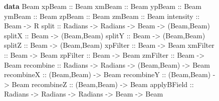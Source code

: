 \documentclass[12pt]{article}
\newcommand{\KeywordTok}[1]{\textcolor[rgb]{0.00,0.44,0.13}{\textbf{{#1}}}}
\newcommand{\DataTypeTok}[1]{\textcolor[rgb]{0.56,0.13,0.00}{{#1}}}
\newcommand{\SpecialCharTok}[1]{\textcolor[rgb]{0.25,0.44,0.63}{{#1}}}
\newcommand{\FunctionTok}[1]{\textcolor[rgb]{0.02,0.16,0.49}{{#1}}}
\newcommand{\NormalTok}[1]{{#1}}
\begin{document}
\begin{figure}
\begin{Highlighting}[]
\KeywordTok{data} \DataTypeTok{Beam}
\FunctionTok{xpBeam} \SpecialCharTok{::} \DataTypeTok{Beam}
\FunctionTok{xmBeam} \SpecialCharTok{::} \DataTypeTok{Beam}
\FunctionTok{ypBeam} \SpecialCharTok{::} \DataTypeTok{Beam}
\FunctionTok{ymBeam} \SpecialCharTok{::} \DataTypeTok{Beam}
\FunctionTok{zpBeam} \SpecialCharTok{::} \DataTypeTok{Beam}
\FunctionTok{zmBeam} \SpecialCharTok{::} \DataTypeTok{Beam}
\FunctionTok{intensity} \SpecialCharTok{::} \DataTypeTok{Beam} \SpecialCharTok{->} \DataTypeTok{R}
\FunctionTok{split} \SpecialCharTok{::} \DataTypeTok{Radians} \SpecialCharTok{->} \DataTypeTok{Radians} \SpecialCharTok{->} \DataTypeTok{Beam} \SpecialCharTok{->} \NormalTok{(}\DataTypeTok{Beam}\NormalTok{,}\DataTypeTok{Beam}\NormalTok{)}
\FunctionTok{splitX} \SpecialCharTok{::} \DataTypeTok{Beam} \SpecialCharTok{->} \NormalTok{(}\DataTypeTok{Beam}\NormalTok{,}\DataTypeTok{Beam}\NormalTok{)}
\FunctionTok{splitY} \SpecialCharTok{::} \DataTypeTok{Beam} \SpecialCharTok{->} \NormalTok{(}\DataTypeTok{Beam}\NormalTok{,}\DataTypeTok{Beam}\NormalTok{)}
\FunctionTok{splitZ} \SpecialCharTok{::} \DataTypeTok{Beam} \SpecialCharTok{->} \NormalTok{(}\DataTypeTok{Beam}\NormalTok{,}\DataTypeTok{Beam}\NormalTok{)}
\FunctionTok{xpFilter} \SpecialCharTok{::} \DataTypeTok{Beam} \SpecialCharTok{->} \DataTypeTok{Beam}
\FunctionTok{xmFilter} \SpecialCharTok{::} \DataTypeTok{Beam} \SpecialCharTok{->} \DataTypeTok{Beam}
\FunctionTok{zpFilter} \SpecialCharTok{::} \DataTypeTok{Beam} \SpecialCharTok{->} \DataTypeTok{Beam}
\FunctionTok{zmFilter} \SpecialCharTok{::} \DataTypeTok{Beam} \SpecialCharTok{->} \DataTypeTok{Beam}
\FunctionTok{recombine} \SpecialCharTok{::} \DataTypeTok{Radians} \SpecialCharTok{->} \DataTypeTok{Radians} \SpecialCharTok{->} \NormalTok{(}\DataTypeTok{Beam}\NormalTok{,}\DataTypeTok{Beam}\NormalTok{) }\SpecialCharTok{->} \DataTypeTok{Beam}
\FunctionTok{recombineX} \SpecialCharTok{::} \NormalTok{(}\DataTypeTok{Beam}\NormalTok{,}\DataTypeTok{Beam}\NormalTok{) }\SpecialCharTok{->} \DataTypeTok{Beam}
\FunctionTok{recombineY} \SpecialCharTok{::} \NormalTok{(}\DataTypeTok{Beam}\NormalTok{,}\DataTypeTok{Beam}\NormalTok{) }\SpecialCharTok{->} \DataTypeTok{Beam}
\FunctionTok{recombineZ} \SpecialCharTok{::} \NormalTok{(}\DataTypeTok{Beam}\NormalTok{,}\DataTypeTok{Beam}\NormalTok{) }\SpecialCharTok{->} \DataTypeTok{Beam}
\FunctionTok{applyBField} \SpecialCharTok{::} \DataTypeTok{Radians} \SpecialCharTok{->} \DataTypeTok{Radians} \SpecialCharTok{->} \DataTypeTok{Radians} \SpecialCharTok{->} \DataTypeTok{Beam} \SpecialCharTok{->} \DataTypeTok{Beam}

\end{Highlighting}
\end{figure}
\end{document}

